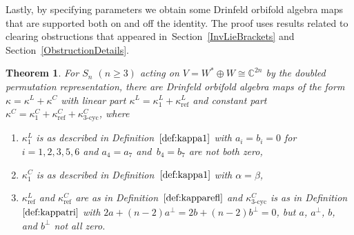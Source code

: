 \documentclass[pdftex]{sigma}
\numberwithin{equation}{section}
\newtheorem{Theorem}{Theorem}[section]
\DeclareMathOperator{\refl}{ref}
\DeclareMathOperator{\tri}{3-cyc}
\begin{document}
Lastly, by specifying parameters we obtain some Drinfeld orbifold algebra
maps that are supported both on and off the identity. The proof uses results
related to clearing obstructions that appeared in~Section~\ref{InvLieBrackets}
and Section~\ref{ObstructionDetails}.

\begin{Theorem}
\label{thm:DOAMapsCombined}
For $S_n$ $(n \geq 3)$ acting on $V=W^* \oplus W \cong \mathbb{C}^{2n}$ by the
doubled permutation representation, there are Drinfeld orbifold algebra maps
of the form $\kappa=\kappa^L+\kappa^C$
with linear part $\kappa^L=\kappa^L_1+\kappa^L_{\refl}$ and
constant part $\kappa^C=\kappa^C_1+\kappa^C_{\refl}+\kappa^C_{\tri}$, where
\begin{enumerate}\itemsep=0pt
\item[$(1)$] $\kappa^L_1$ is as described in Definition~$\ref{def:kappa1}$ with $a_i=b_i=0$
for $i=1, 2, 3, 5, 6$ and $a_4=a_7$ and~$b_4=b_7$ are not both zero,
\item[$(2)$] $\kappa^C_1$ is as described in Definition~$\ref{def:kappa1}$ with $\alpha=\beta$,
\item[$(3)$] $\kappa^L_{\refl}$ and $\kappa^C_{\refl}$ are as in Definition~$\ref{def:kapparefl}$ and
$\kappa^C_{\tri}$ is as in Definition~$\ref{def:kappatri}$ with
$2a+(n-2)a^\perp=2b+(n-2)b^\perp=0$, but $a$, $a^\perp$, $b$, and $b^\perp$ not all zero.
\end{enumerate}
\end{Theorem}
\end{document}
